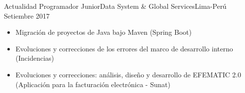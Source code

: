 %
\begin{experiences}
  \experience
    {Actualidad}   { Programador Junior}{Data System \& Global Services}{Lima-Perú}
    {Setiembre 2017} {
                      \begin{itemize}
                        \item Migración de proyectos de Java bajo Maven (Spring Boot)                 
                        \item Evoluciones y correcciones de los errores del marco de desarrollo interno (Incidencias)              
                        \item Evoluciones y correcciones: análisis, diseño y desarrollo de EFEMATIC 2.0 (Aplicación para la facturación electrónica - Sunat)
                       

\end{itemize}}
\end{experiences}
